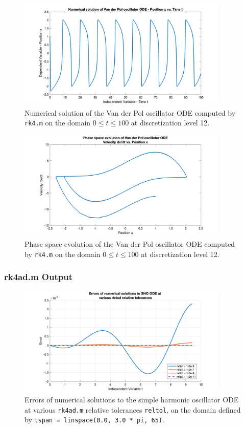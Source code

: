 \documentclass[10pt]{article}
\def\code#1{\texttt{#1}} %
\begin{document}
\begin{figure}[H]
\centering
\includegraphics[width=0.9\textwidth]{trk4_vdp_1.png}
\caption{Numerical solution of the Van der Pol oscillator ODE computed by \code{rk4.m} on the domain
$0 \leq t \leq 100$ at discretization level 12.}\label{trk4_vdp_1_fig}
\end{figure}

\begin{figure}[H]
\centering
\includegraphics[width=0.9\textwidth]{trk4_vdp_2.png}
\caption{Phase space evolution of the Van der Pol oscillator ODE computed by \code{rk4.m} on the domain
$0 \leq t \leq 100$ at discretization level 12.}\label{trk4_vdp_2_fig}
\end{figure}

\subsubsection*{rk4ad.m Output}

\begin{figure}[H]
\centering
\includegraphics[width=0.9\textwidth]{trk4ad_sho_2.png}
\caption{Errors of numerical solutions to the simple harmonic oscillator ODE at various \code{rk4ad.m}
relative tolerances \code{reltol}, on the domain defined by \code{tspan = linspace(0.0, 3.0 * pi, 65)}.
}\label{trk4ad_sho_2_fig}
\end{figure}
\end{document}
